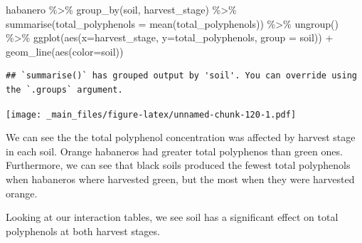 \documentclass[
]{book}
\newenvironment{Shaded}{\begin{snugshade}}{\end{snugshade}}
\newcommand{\AttributeTok}[1]{\textcolor[rgb]{0.77,0.63,0.00}{#1}}
\newcommand{\FunctionTok}[1]{\textcolor[rgb]{0.00,0.00,0.00}{#1}}
\newcommand{\NormalTok}[1]{#1}
\newcommand{\OtherTok}[1]{\textcolor[rgb]{0.56,0.35,0.01}{#1}}
\newcommand{\SpecialCharTok}[1]{\textcolor[rgb]{0.00,0.00,0.00}{#1}}
\newcommand{\StringTok}[1]{\textcolor[rgb]{0.31,0.60,0.02}{#1}}
\begin{document}
\begin{Shaded}
\begin{Highlighting}[]
\NormalTok{habanero }\SpecialCharTok{\%\textgreater{}\%}
  \FunctionTok{group\_by}\NormalTok{(soil, harvest\_stage) }\SpecialCharTok{\%\textgreater{}\%}
  \FunctionTok{summarise}\NormalTok{(}\AttributeTok{total\_polyphenols =} \FunctionTok{mean}\NormalTok{(total\_polyphenols)) }\SpecialCharTok{\%\textgreater{}\%}
  \FunctionTok{ungroup}\NormalTok{() }\SpecialCharTok{\%\textgreater{}\%}
  \FunctionTok{ggplot}\NormalTok{(}\FunctionTok{aes}\NormalTok{(}\AttributeTok{x=}\NormalTok{harvest\_stage, }\AttributeTok{y=}\NormalTok{total\_polyphenols, }\AttributeTok{group =}\NormalTok{ soil)) }\SpecialCharTok{+}
  \FunctionTok{geom\_line}\NormalTok{(}\FunctionTok{aes}\NormalTok{(}\AttributeTok{color=}\NormalTok{soil))}
\end{Highlighting}
\end{Shaded}

\begin{verbatim}
## `summarise()` has grouped output by 'soil'. You can override using the `.groups` argument.
\end{verbatim}

\texttt{[image: \_main\_files/figure-latex/unnamed-chunk-120-1.pdf]}

We can see the the total polyphenol concentration was affected by harvest stage in each soil. Orange habaneros had greater total polyphenos than green ones. Furthermore, we can see that black soils produced the fewest total polyphenols when habaneros where harvested green, but the most when they were harvested orange.

Looking at our interaction tables, we see soil has a significant effect on total polyphenols at both harvest stages.

\begin{Shaded}
\end{Shaded}
\end{document}
